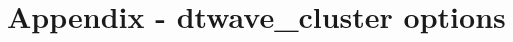 \documentclass[a4paper]{article}
\begin{document}

\clearpage
\section{Appendix - dtwave\_cluster options}
\end{document}
